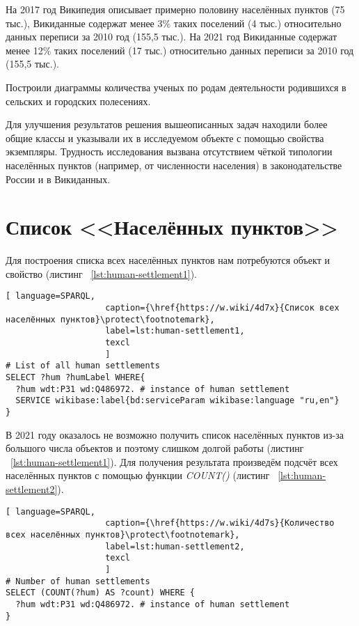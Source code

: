 
На 2017 год Википедия описывает примерно половину населённых пунктов (75 тыс.), Викиданные содержат менее 3\% таких поселений (4 тыс.) относительно данных переписи за 2010 год (155,5 тыс.). На 2021 год Викиданные содержат менее 12\% таких поселений (17 тыс.) относительно данных переписи за 2010 год (155,5 тыс.). 

Построили диаграммы количества ученых по родам деятельности родившихся в сельских и городских полесениях.

Для улучшения результатов решения вышеописанных задач находили более общие классы и указывали их в исследуемом объекте с помощью свойства экземпляры. Трудность исследования вызвана отсутствием чёткой типологии населённых пунктов (например, от численности населения) в законодательстве России и в Викиданных.

\section{Список <<Населённых пунктов>>}

Для построения списка всех населённых пунктов нам потребуются объект  и свойство  (листинг ~\protect\ref{lst:human-settlement1}).

\begin{lstlisting}[ language=SPARQL, 
                    caption={\href{https://w.wiki/4d7x}{Список всех населённых пунктов}\protect\footnotemark},
                    label=lst:human-settlement1,
                    texcl 
                    ]
# List of all human settlements
SELECT ?hum ?humLabel WHERE{
  ?hum wdt:P31 wd:Q486972. # instance of human settlement
  SERVICE wikibase:label{bd:serviceParam wikibase:language "ru,en"}
}
\end{lstlisting}%

В 2021 году оказалось не возможно получить список населённых пунктов из-за большого числа объектов и поэтому слишком долгой работы (листинг ~\protect\ref{lst:human-settlement1}). Для получения результата произведём подсчёт всех населённых пунктов с помощью функции \textit{COUNT()} (листинг ~\protect\ref{lst:human-settlement2}).

\begin{lstlisting}[ language=SPARQL, 
                    caption={\href{https://w.wiki/4d7s}{Количество всех населённых пунктов}\protect\footnotemark},
                    label=lst:human-settlement2,
                    texcl 
                    ]
# Number of human settlements
SELECT (COUNT(?hum) AS ?count) WHERE {
  ?hum wdt:P31 wd:Q486972. # instance of human settlement  
}
\end{lstlisting}%

